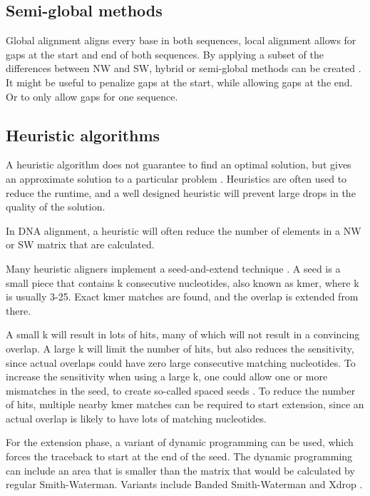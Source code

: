 \documentclass[../main/thesis.tex]{subfiles}
\begin{document}
\subsection{Semi-global methods}
Global alignment aligns every base in both sequences, local alignment allows for gaps at the start and end of both sequences.
By applying a subset of the differences between NW and SW, hybrid or semi-global methods can be created \cite{semi_global1}\cite{semi_global2}.
It might be useful to penalize gaps at the start, while allowing gaps at the end.
Or to only allow gaps for one sequence.


\subsection{Heuristic algorithms}

A heuristic algorithm does not guarantee to find an optimal solution, but gives an approximate solution to a particular problem \cite{heuristic}.
Heuristics are often used to reduce the runtime, and a well designed heuristic will prevent large drops in the quality of the solution.

In DNA alignment, a heuristic will often reduce the number of elements in a NW or SW matrix that are calculated.

Many heuristic aligners implement a seed-and-extend technique \cite{seed_extend}.
A seed is a small piece that contains k consecutive nucleotides, also known as kmer, where k is usually 3-25.
Exact kmer matches are found, and the overlap is extended from there.

A small k will result in lots of hits, many of which will not result in a convincing overlap.
A large k will limit the number of hits, but also reduces the sensitivity, since actual overlaps could have zero large consecutive matching nucleotides.
To increase the sensitivity when using a large k, one could allow one or more mismatches in the seed, to create so-called spaced seeds \cite{spaced_seeds}.
To reduce the number of hits, multiple nearby kmer matches can be required to start extension, since an actual overlap is likely to have lots of matching nucleotides.

For the extension phase, a variant of dynamic programming can be used, which forces the traceback to start at the end of the seed.
The dynamic programming can include an area that is smaller than the matrix that would be calculated by regular Smith-Waterman.
Variants include Banded Smith-Waterman \cite{banded_SW} and Xdrop \cite{Xdrop}.
\end{document}
